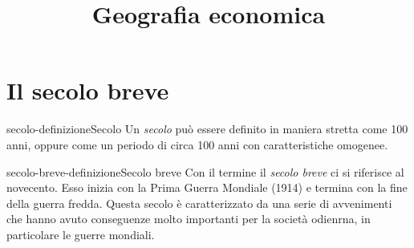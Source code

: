 \documentclass[preview]{standalone}
\begin{document}
\title{Geografia economica}
\genpage

\section{Il secolo breve}

\begin{snippetdefinition}{secolo-definizione}{Secolo}
    Un \textit{secolo} può essere definito in maniera stretta come 100 anni,
    oppure come un periodo di circa 100 anni con caratteristiche omogenee.
\end{snippetdefinition}

\begin{snippetdefinition}{secolo-breve-definizione}{Secolo breve}
    Con il termine il \textit{secolo breve} ci si riferisce al novecento.
    Esso inizia con la Prima Guerra Mondiale (1914) e termina con la fine della guerra fredda.
    Questa secolo è caratterizzato da una serie di avvenimenti che hanno avuto conseguenze molto importanti
    per la società odienrna, in particolare le guerre mondiali.
\end{snippetdefinition}
\end{document}
